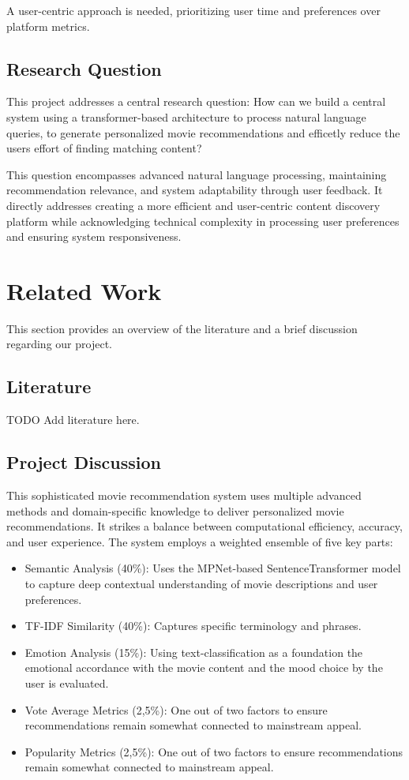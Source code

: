 \documentclass[12pt,a4paper]{article}
\begin{document}
  \noindent A user-centric approach is needed, prioritizing user time and preferences over platform metrics.

  \subsection{Research Question}

  This project addresses a central research question:
  How can we build a central system using a transformer-based architecture to process natural language queries,
  to generate personalized movie recommendations and efficetly reduce the users effort of finding matching content?

  \noindent This question encompasses advanced natural language processing, maintaining recommendation relevance, and system
  adaptability through user feedback. It directly addresses creating a more efficient and user-centric content discovery
  platform while acknowledging technical complexity in processing user preferences and ensuring system responsiveness.


  \section{Related Work}

  This section provides an overview of the literature and a brief discussion regarding our project.

  \subsection{Literature}

  TODO Add literature here.

  \subsection{Project Discussion}

  This sophisticated movie recommendation system uses multiple advanced methods and domain-specific knowledge
  to deliver personalized movie recommendations. It strikes a balance between computational efficiency, accuracy, and
  user experience.
  The system employs a weighted ensemble of five key parts:
  \begin{itemize}
    \item Semantic Analysis (40\%): Uses the MPNet-based SentenceTransformer model to capture deep contextual understanding of movie descriptions and user preferences.
    \item TF-IDF Similarity (40\%): Captures specific terminology and phrases.
    \item Emotion Analysis (15\%): Using text-classification as a foundation the emotional accordance with the movie content and the mood choice by the user is evaluated.
    \item Vote Average Metrics (2,5\%): One out of two factors to ensure recommendations remain somewhat connected to mainstream appeal.
    \item Popularity Metrics (2,5\%): One out of two factors to ensure recommendations remain somewhat connected to mainstream appeal.
  \end{itemize}
\end{document}
